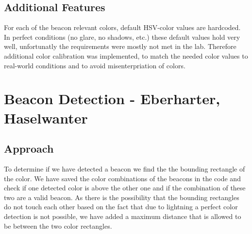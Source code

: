 \documentclass[703031]{iisreport}
\begin{document}
\subsection{Additional Features}
For each of the beacon relevant colors, default HSV-color values are hardcoded. In perfect conditions (no glare, no shadows, etc.) these default values hold very well, unfortunatly the requirements were mostly not met in the lab. Therefore additional color calibration was implemented, to match the needed color values to real-world conditions and to avoid misenterpriation of colors.


\section{Beacon Detection - Eberharter, Haselwanter}
\subsection{Approach}
To determine if we have detected a beacon we find the the bounding rectangle of the color. We have saved the color combinations of the beacons in the code and check if one detected color is above the other one and if the combination of these two are a valid beacon. As there is the possibility that the bounding rectangles do not touch each other based on the fact that due to lightning a perfect color detection is not possible, we have added a maximum distance that is allowed to be between the two color rectangles.
\end{document}

